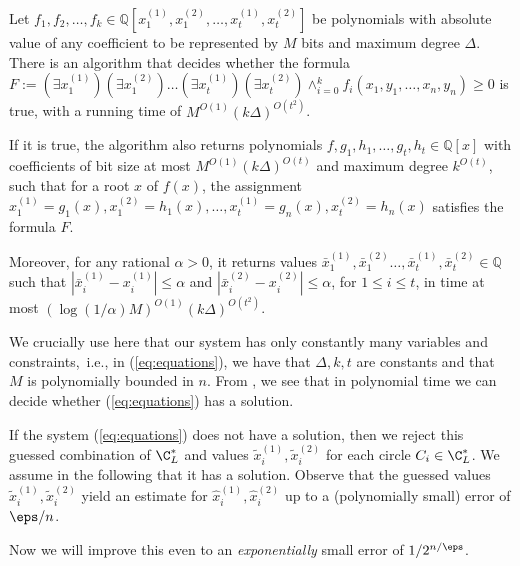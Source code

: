 \begin{theorem}
	\label{thm:GrigorevVV88}
	Let $f_1, f_2, \dots, f_k \in \mathbb{Q}[x_{1}^{(1)},x_{1}^{(2)}, \dots, x_{t}^{(1)},x_{t}^{(2)}]$ be polynomials with absolute value of any coefficient to be represented by $M$ bits and maximum degree $\Delta$.
	There is an algorithm that decides whether the formula $F:= (\exists x_{1}^{(1)})(\exists x_{1}^{(2)}) \dots (\exists x_{t}^{(1)}) (\exists x_{t}^{(2)}) \land_{i=0}^{k} f_i(x_1, y_1, \dots, x_n, y_n) \geqslant 0$ is true, with a running time of $M^{O(1)}(k\Delta)^{O(t^2)}$.
	
	If it is true, the algorithm also returns polynomials $f, g_1, h_1, \dots, g_t, h_t \in \mathbb{Q}[x]$ with coefficients of bit size at most $M^{O(1)} (k \Delta)^{O(t)}$ and maximum degree $k^{O(t)}$, such that for a root $x$ of $f(x)$, the assignment $x_{1}^{(1)}=g_1(x), x_{1}^{(2)}=h_1(x), \dots, x_{t}^{(1)}=g_n(x), x_{t}^{(2)}=h_n(x)$
	satisfies the
	formula $F$.
	
	Moreover, for any rational $\alpha>0$, it returns values $\bar{x}_{1}^{(1)},\bar{x}_{1}^{(2)} \dots, \bar{x}_{t}^{(1)},\bar{x}_{t}^{(2)} \in \mathbb{Q}$ such that $| \bar{x}_{i}^{(1)}- {x}_{i}^{(1)} | \leqslant \alpha$ and  $| \bar{x}_{i}^{(2)}- {x}_{i}^{(2)} | \leqslant \alpha$, for $1 \leqslant i \leqslant t$, in time at most $(\log (1/\alpha) M)^{O(1)} (k \Delta)^{O(t^2)}$.
\end{theorem}




We crucially use here that our system has only constantly many variables
and constraints,~i.e., in (\ref{eq:equations}), we have that $\Delta, k, t$ are constants and that $M$ is polynomially bounded in $n$.
From , we see that
in polynomial time we can decide whether
(\ref{eq:equations}) has a solution.

If the system (\ref{eq:equations}) does
not have a solution, then we reject this guessed combination of $\C_{L}^{*}$
and values $\tilde{x}_{i}^{(1)},\tilde{x}_{i}^{(2)}$ for each circle
$C_{i}\in\C_{L}^{*}$. We assume in the following that it has a solution.
Observe that the guessed values $\tilde{x}_{i}^{(1)},\tilde{x}_{i}^{(2)}$
yield an estimate for $\hat{x}_{i}^{(1)},\hat{x}_{i}^{(2)}$ up to
a (polynomially small) error of $\eps/n$.

Now we will improve this even to an \emph{exponentially} small error of $1/2^{n/\eps}$.


